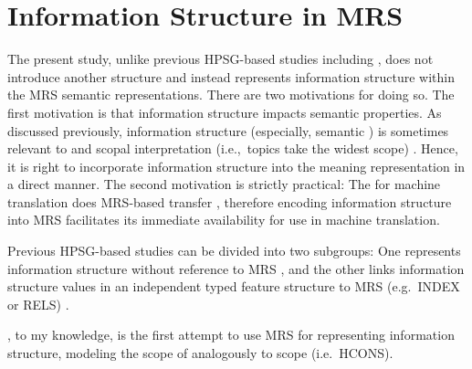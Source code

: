 \section{Information Structure in MRS}
\label{8:sec:mrs}


The present study, unlike previous HPSG-based studies including
\citet{engdahl:vallduvi:96}, does not introduce another structure and
instead represents information structure within the MRS semantic
representations. There are two motivations for doing so. The
first motivation is that information structure impacts semantic
properties. As discussed previously, information structure
(especially, semantic  \citep{gundel:99}) is sometimes relevant
to  and scopal interpretation (i.e.,\ topics
take the widest scope)
\citep{buring:97,portner:yabushita:98,erteschik:99,erteschik:07,bianchi:frascarelli:10}.
Hence, it is right to incorporate information structure into the
meaning representation in a direct manner.  The second motivation is
strictly practical: The  for machine translation
does MRS-based transfer \citep{oepen:etal:07}, therefore encoding
information structure into MRS facilitates its immediate availability
for use in machine translation.



Previous HPSG-based studies can be divided into two subgroups: One
represents information structure without reference to MRS
\citep{dekuthy:00,chang:02,chung:etal:03,ohtani:matsumoto:04,webelhuth:07,kim:07,kim:12a},
and the other links information structure values in an independent
typed feature structure to MRS (e.g.\ INDEX or RELS)
\citep{wilcock:05,yoshimoto:etal:06,paggio:09,bildhauer:cook:10,sato:tam:12}.



\citet{wilcock:05}, to my knowledge, is the first attempt to use MRS
for representing information structure, modeling the scope of 
analogously to  scope (i.e.\ HCONS).





